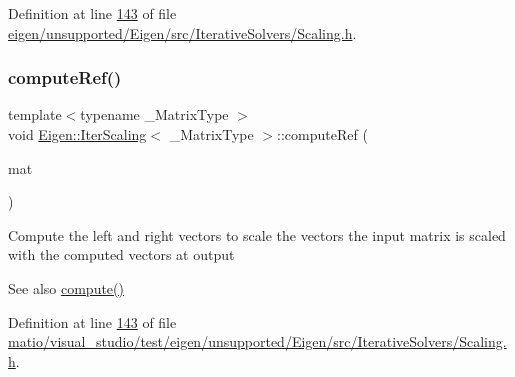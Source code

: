 Definition at line \hyperlink{eigen_2unsupported_2_eigen_2src_2_iterative_solvers_2_scaling_8h_source_l00143}{143} of file \hyperlink{eigen_2unsupported_2_eigen_2src_2_iterative_solvers_2_scaling_8h_source}{eigen/unsupported/\+Eigen/src/\+Iterative\+Solvers/\+Scaling.\+h}.

\mbox{\label{class_eigen_1_1_iter_scaling_aeff5ccef2ccb32c6f472a190f8a511af}} 
\subsubsection{\texorpdfstring{compute\+Ref()}{computeRef()}\hspace{0.1cm}{\footnotesize\ttfamily [2/2]}}
{\footnotesize\ttfamily template$<$typename \+\_\+\+Matrix\+Type $>$ \\
void \hyperlink{class_eigen_1_1_iter_scaling}{Eigen\+::\+Iter\+Scaling}$<$ \+\_\+\+Matrix\+Type $>$\+::compute\+Ref (\begin{DoxyParamCaption}\item[{Matrix\+Type \&}]{mat }\end{DoxyParamCaption})\hspace{0.3cm}{\ttfamily [inline]}}

Compute the left and right vectors to scale the vectors the input matrix is scaled with the computed vectors at output

\begin{DoxySeeAlso}{See also}
\hyperlink{class_eigen_1_1_iter_scaling_a6a76754399fd004b3ac6011e272ffb71}{compute()} 
\end{DoxySeeAlso}


Definition at line \hyperlink{matio_2visual__studio_2test_2eigen_2unsupported_2_eigen_2src_2_iterative_solvers_2_scaling_8h_source_l00143}{143} of file \hyperlink{matio_2visual__studio_2test_2eigen_2unsupported_2_eigen_2src_2_iterative_solvers_2_scaling_8h_source}{matio/visual\+\_\+studio/test/eigen/unsupported/\+Eigen/src/\+Iterative\+Solvers/\+Scaling.\+h}.

\mbox{\label{class_eigen_1_1_iter_scaling_ab88d288be912d90a1e597e5dab0bd47b}} 
